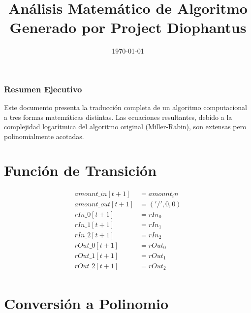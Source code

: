 \documentclass[10pt, a4paper]{article}
\title{Análisis Matemático de Algoritmo \\ \large Generado por Project Diophantus}
\author{}
\date{\today}
\begin{document}
\maketitle
\section*{Resumen Ejecutivo}
Este documento presenta la traducción completa de un algoritmo computacional a tres formas matemáticas distintas.
Las ecuaciones resultantes, debido a la complejidad logarítmica del algoritmo original (Miller-Rabin), son extensas pero polinomialmente acotadas.
\part{Función de Transición}
\begin{align*}
amount\_in[t+1] &= amount_in \\
amount\_out[t+1] &= ('/', 0, 0) \\
rIn\_0[t+1] &= rIn_0 \\
rIn\_1[t+1] &= rIn_1 \\
rIn\_2[t+1] &= rIn_2 \\
rOut\_0[t+1] &= rOut_0 \\
rOut\_1[t+1] &= rOut_1 \\
rOut\_2[t+1] &= rOut_2 \\
\end{align*}\part{Conversión a Polinomio}
\end{document}
